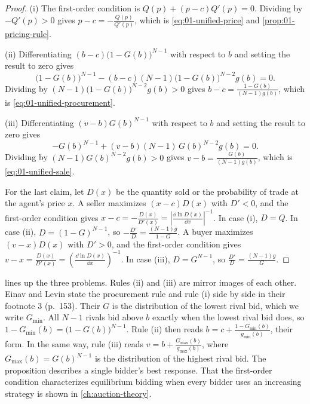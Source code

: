 \begin{proof}
(i) The first-order condition is $Q(p) + (p - c)Q'(p) = 0$. Dividing by $-Q'(p) > 0$ gives
$p - c = -\frac{Q(p)}{Q'(p)}$, which is \eqref{eq:01-unified-price} and \cref{prop:01-pricing-rule}.

(ii) Differentiating $(b - c)\big(1 - G(b)\big)^{N-1}$ with respect to $b$ and setting the result to zero gives
\[
  \big(1 - G(b)\big)^{N-1} - (b - c)(N - 1)\big(1 - G(b)\big)^{N-2} g(b) = 0 .
\]
Dividing by $(N - 1)\big(1 - G(b)\big)^{N-2}g(b) > 0$ gives $b - c = \frac{1 - G(b)}{(N - 1)g(b)}$, which is
\eqref{eq:01-unified-procurement}.

(iii) Differentiating $(v - b)G(b)^{N-1}$ with respect to $b$ and setting the result to zero gives
\[
  -G(b)^{N-1} + (v - b)(N - 1)\,G(b)^{N-2} g(b) = 0 .
\]
Dividing by $(N - 1)G(b)^{N-2}g(b) > 0$ gives $v - b = \frac{G(b)}{(N - 1)g(b)}$, which is
\eqref{eq:01-unified-sale}.

For the last claim, let $D(x)$ be the quantity sold or the probability of trade at the agent's price $x$. A
seller maximizes $(x - c)D(x)$ with $D' < 0$, and the first-order condition gives
$x - c = -\frac{D(x)}{D'(x)} = \left\lvert \frac{\dd \ln D(x)}{\dd x} \right\rvert^{-1}$. In case (i),
$D = Q$. In case (ii), $D = (1 - G)^{N-1}$, so $-\frac{D'}{D} = \frac{(N - 1)g}{1 - G}$. A buyer maximizes $(v - x)D(x)$ with $D' > 0$, and
the first-order condition gives $v - x = \frac{D(x)}{D'(x)} = \left(\frac{\dd \ln D(x)}{\dd x}\right)^{-1}$.
In case (iii),
$D = G^{N-1}$, so $\frac{D'}{D} = \frac{(N - 1)g}{G}$.
\end{proof}

 lines up the three problems. Rules (ii) and (iii) are mirror images of each other.
Einav and Levin state the procurement rule and rule (i) side by side in their footnote 3 (p.~153). Their $G$
is the distribution of the lowest rival bid, which we write $G_{\min}$. All $N - 1$ rivals bid above $b$
exactly when the lowest rival bid does, so $1 - G_{\min}(b) = \big(1 - G(b)\big)^{N-1}$. Rule (ii) then reads
$b = c + \frac{1 - G_{\min}(b)}{g_{\min}(b)}$, their form. In the same way, rule (iii) reads
$v = b + \frac{G_{\max}(b)}{g_{\max}(b)}$, where $G_{\max}(b) = G(b)^{N-1}$ is the distribution of the
highest rival bid. The proposition describes a single bidder's best response. That the first-order condition
characterizes equilibrium bidding when every bidder uses an increasing strategy is shown in
\cref{ch:auction-theory}.

